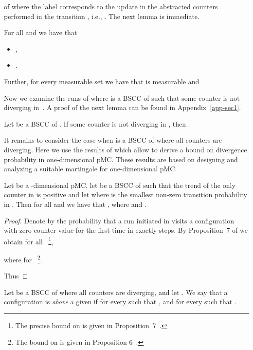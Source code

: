 of  where the label  
corresponds to the update in the abstracted counters performed in
the transition ,
i.e., . 
The next lemma is immediate.
\begin{lemma}\label{prop:one-counter-runs}
For all  and 
 we have that
\begin{itemize}
\item ,
\item .
\end{itemize}
Further, for every measurable set 
 we have that  is measurable and
\end{lemma}

\noindent
Now we examine the runs of  where  is a BSCC of
 such that some counter is not diverging in~. A proof of
the next lemma can be found in Appendix~\ref{app-sec1}.

\begin{lemma}
\label{lem:not-diverging}
  Let  be a BSCC of .
  If some counter is not diverging in , then .
\end{lemma}

It remains to consider the case when  is a BSCC of 
where all counters are diverging. Here we use the results of
\cite{BKK:pOC-time-LTL-martingale} which allow to derive
a bound on divergence probability in one-dimensional pMC.
These results are based on designing and analyzing a suitable
martingale for one-dimensional pMC. 

\begin{lemma}
\label{lem-divergence}
  Let  be a -dimensional pMC, let  be a BSCC of  
  such that the trend  of the only counter in  is positive and let  where  is the smallest non-zero transition probability in .
  Then for all  and  we have that  
  , where  and .
\end{lemma}
\begin{proof}
Denote by  the probability that a run initiated in  visits a configuration with zero counter value for the first time in exactly  steps. By Proposition~7 of \cite{BKK:pOC-time-LTL-martingale-arxiv} we obtain for all ~\footnote{The precise bound on  is given in Proposition~7~\cite{BKK:pOC-time-LTL-martingale-arxiv}.},

where  for ~\footnote{The bound on  is given in Proposition 6~\cite{BKK:pOC-time-LTL-martingale-arxiv}.}.

Thus

\end{proof}



\begin{definition}
  Let  be a BSCC of  where all counters are diverging,
  and let . We say that a configuration 
  is \emph{above} a given  if  for every
   such that , and 
   for every
   such that . 
\end{definition}


